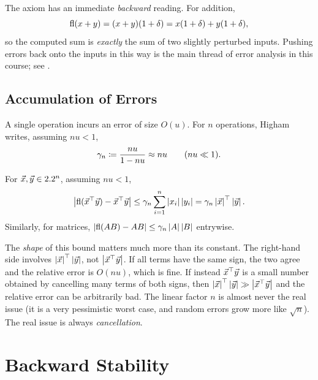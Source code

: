 The axiom has an immediate \emph{backward} reading. For addition,
\begin{equation}
  \operatorname{fl}(x + y) = (x + y)(1 + \delta) = x(1 + \delta) + y(1 + \delta),
\end{equation}
so the computed sum is \emph{exactly} the sum of two slightly perturbed inputs. Pushing errors back onto the inputs in this way is the main thread of error analysis in this course; see .

\subsection{Accumulation of Errors}

A single operation incurs an error of size $O(u)$. For $n$ operations, Higham~\cite[\S3.1]{Higham} writes, assuming $nu < 1$,
\begin{equation}
  \gamma_n \coloneqq \frac{nu}{1 - nu} \approx nu \qquad (nu \ll 1).
\end{equation}

\begin{proposition}
  \label{prop:dot}
  For $\vec{x}, \vec{y} \in 2.2^n$, assuming $nu < 1$,
  \begin{equation}
    \left\lvert \operatorname{fl}(\vec{x}^\top \vec{y}) - \vec{x}^\top \vec{y} \right\rvert \le \gamma_n \sum_{i=1}^{n} \left\lvert x_i \right\rvert\left\lvert y_i \right\rvert = \gamma_n \left\lvert \vec{x} \right\rvert^\top \left\lvert \vec{y} \right\rvert.
  \end{equation}
  Similarly, for matrices, $\left\lvert \operatorname{fl}(AB) - AB \right\rvert \le \gamma_n \left\lvert A \right\rvert\left\lvert B \right\rvert$ entrywise.
\end{proposition}

The \emph{shape} of this bound matters much more than its constant. The right-hand side involves $\left\lvert \vec{x} \right\rvert^\top\left\lvert \vec{y} \right\rvert$, not $\left\lvert \vec{x}^\top\vec{y} \right\rvert$. If all terms have the same sign, the two agree and the relative error is $O(nu)$, which is fine. If instead $\vec{x}^\top\vec{y}$ is a small number obtained by cancelling many terms of both signs, then $\left\lvert \vec{x} \right\rvert^\top\left\lvert \vec{y} \right\rvert \gg \left\lvert \vec{x}^\top\vec{y} \right\rvert$ and the relative error can be arbitrarily bad. The linear factor $n$ is almost never the real issue (it is a very pessimistic worst case, and random errors grow more like $\sqrt{n}$). The real issue is always \emph{cancellation}.

\section{Backward Stability}
\label{sec:backward}

